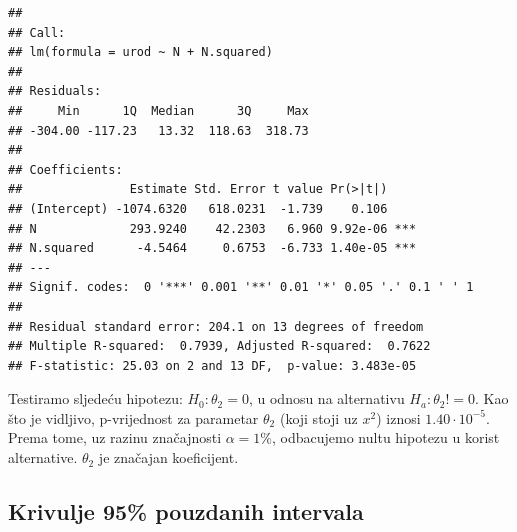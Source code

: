 \documentclass[]{article}
\newenvironment{Shaded}{\begin{snugshade}}{\end{snugshade}}
\newcommand{\KeywordTok}[1]{\textcolor[rgb]{0.13,0.29,0.53}{\textbf{{#1}}}}
\newcommand{\DataTypeTok}[1]{\textcolor[rgb]{0.13,0.29,0.53}{{#1}}}
\newcommand{\DecValTok}[1]{\textcolor[rgb]{0.00,0.00,0.81}{{#1}}}
\newcommand{\StringTok}[1]{\textcolor[rgb]{0.31,0.60,0.02}{{#1}}}
\newcommand{\OtherTok}[1]{\textcolor[rgb]{0.56,0.35,0.01}{{#1}}}
\newcommand{\NormalTok}[1]{{#1}}
\begin{document}
\begin{verbatim}
## 
## Call:
## lm(formula = urod ~ N + N.squared)
## 
## Residuals:
##     Min      1Q  Median      3Q     Max 
## -304.00 -117.23   13.32  118.63  318.73 
## 
## Coefficients:
##               Estimate Std. Error t value Pr(>|t|)    
## (Intercept) -1074.6320   618.0231  -1.739    0.106    
## N             293.9240    42.2303   6.960 9.92e-06 ***
## N.squared      -4.5464     0.6753  -6.733 1.40e-05 ***
## ---
## Signif. codes:  0 '***' 0.001 '**' 0.01 '*' 0.05 '.' 0.1 ' ' 1
## 
## Residual standard error: 204.1 on 13 degrees of freedom
## Multiple R-squared:  0.7939, Adjusted R-squared:  0.7622 
## F-statistic: 25.03 on 2 and 13 DF,  p-value: 3.483e-05
\end{verbatim}

Testiramo sljedeću hipotezu: \(H_0 : \theta_2 = 0\), u odnosu na
alternativu \(H_a : \theta_2 != 0\). Kao što je vidljivo, p-vrijednost
za parametar \(\theta_2\) (koji stoji uz \(x^ 2\)) iznosi
\(1.40\cdot10^{-5}\). Prema tome, uz razinu značajnosti \(\alpha=1\%\),
odbacujemo nultu hipotezu u korist alternative. \(\theta_2\) je značajan
koeficijent.

\subsection{Krivulje 95\% pouzdanih
intervala}\label{krivulje-95-pouzdanih-intervala-1}

\begin{Shaded}
\end{Shaded}
\end{document}
